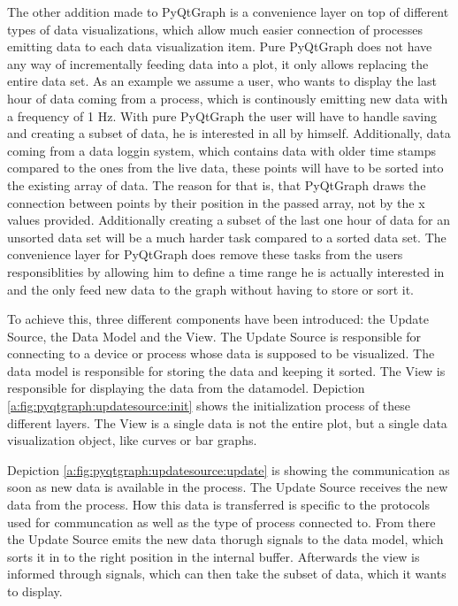 The other addition made to PyQtGraph is a convenience layer on top of different
types of data visualizations, which allow much easier connection of processes
emitting data to each data visualization item. Pure PyQtGraph does not have any
way of incrementally feeding data into a plot, it only allows replacing the
entire data set. As an example we assume a user, who wants to display the last
hour of data coming from a process, which is continously emitting new data with
a frequency of 1 Hz. With pure PyQtGraph the user will have to handle saving and
creating a subset of data, he is interested in all by himself. Additionally,
data coming from a data loggin system, which contains data with older time
stamps compared to the ones from the live data, these points will have to be
sorted into the existing array of data. The reason for that is, that PyQtGraph
draws the connection between points by their position in the passed array, not
by the x values provided. Additionally creating a subset of the last one hour of
data for an unsorted data set will be a much harder task compared to a sorted
data set. The convenience layer for PyQtGraph does remove these tasks from the
users responsiblities by allowing him to define a time range he is actually
interested in and the only feed new data to the graph without having to store or
sort it.

To achieve this, three different components have been introduced: the Update
Source, the Data Model and the View. The Update Source is responsible for
connecting to a device or process whose data is supposed to be visualized. The
data model is responsible for storing the data and keeping it sorted. The View
is responsible for displaying the data from the datamodel. Depiction
\ref{a:fig:pyqtgraph:updatesource:init} shows the initialization
process of these different layers. The View is a single data is not the entire
plot, but a single data visualization object, like curves or bar graphs.

Depiction \ref{a:fig:pyqtgraph:updatesource:update} is showing the
communication as soon as new data is available in the process. The Update Source
receives the new data from the process. How this data is transferred is specific
to the protocols used for communcation as well as the type of process connected
to. From there the Update Source emits the new data thorugh signals to the data
model, which sorts it in to the right position in the internal buffer.
Afterwards the view is informed through signals, which can then take the subset
of data, which it wants to display.

